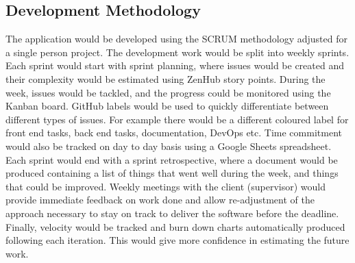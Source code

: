 \subsection{Development Methodology}
The application would be developed using the SCRUM methodology adjusted for a single person project.
The development work would be split into weekly sprints. Each sprint would start with sprint
planning, where issues would be created and their complexity would be estimated using ZenHub
story points. During the week, issues would be tackled, and the progress could be monitored using
the Kanban board. GitHub labels would be used to quickly differentiate between different types
of issues. For example there would be a different coloured label for front end tasks, back end
tasks, documentation, DevOps etc. Time commitment would also be tracked on day to day basis
using a Google Sheets spreadsheet\cite{33}. Each sprint would end with a sprint retrospective, where
a document would be produced containing a list of things that went well during the week, and things
that could be improved. Weekly meetings with the client (supervisor) would provide immediate feedback
on work done and allow re-adjustment of the approach necessary to stay on track to deliver the
software before the deadline. Finally, velocity would be tracked and burn down charts automatically
produced following each iteration. This would give more confidence in estimating the future work.


